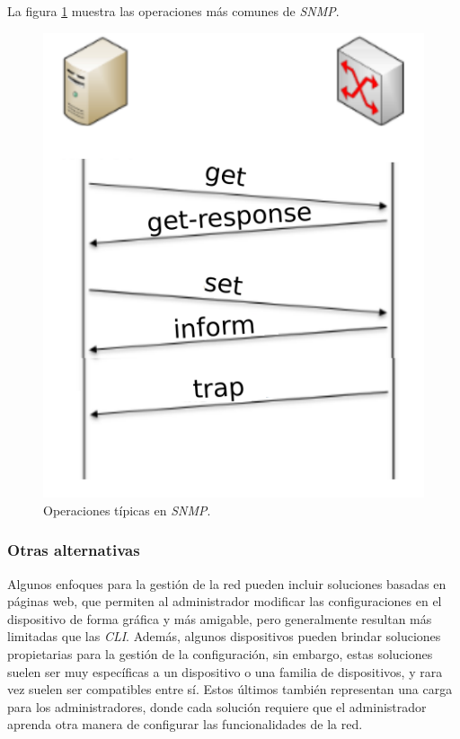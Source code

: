 La figura \ref{fig:snmpfig} muestra las operaciones más comunes de \textit{SNMP}.

\begin{figure}[htbp]
	\centering
	\includegraphics[scale=0.8]{Figures/snmp_ejemplo.pdf}
	\caption{Operaciones típicas en \textit{SNMP}.}
	\label{fig:snmpfig}
  \end{figure}

\subsubsection{Otras alternativas}
Algunos enfoques para la gestión de la red pueden incluir soluciones basadas en páginas web, que permiten al administrador modificar las configuraciones en el dispositivo de forma gráfica y más amigable, pero generalmente resultan más limitadas que las \textit{CLI}. 
Además, algunos dispositivos pueden brindar soluciones propietarias para la gestión de la configuración, sin embargo, estas soluciones suelen ser muy específicas a un dispositivo o una familia de dispositivos, y rara vez suelen ser compatibles entre sí. Estos últimos también representan una carga para los administradores, donde cada solución requiere que el administrador aprenda otra manera de configurar las funcionalidades de la red.  

